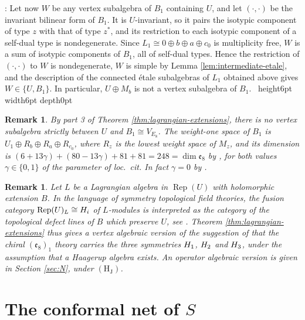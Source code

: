 \documentclass[leqno]{article}
\let\cal\relax
\newcommand{\cal}{\mathcal}
\newcommand{\qed}{\hfill \vrule height6pt  width6pt depth0pt}
\DeclareMathOperator{\Rep}{Rep} %
\newtheorem{remark}[thm]{Remark}
\newenvironment{proof}[1][]{\noindent {\it Proof #1} : }{\hbox{~}\qed
\smallskip
}
\numberwithin{equation}{section}
\begin{document}
\begin{proof}
Let now $W$ be any vertex subalgebra of $B_1$ containing $U$, and let $(\cdot,\cdot)$ be the invariant bilinear form of $B_1$. It is $U$-invariant, so it pairs the isotypic component of type $z$ with that of type $z^*$, and its restriction to each isotypic component of a self-dual type is nondegenerate. Since $L_1 \cong 0 \oplus b \oplus a \oplus c_0$ is multiplicity free, $W$ is a sum of isotypic components of $B_1$, all of self-dual types. Hence the restriction of $(\cdot,\cdot)$ to $W$ is nondegenerate, $W$ is simple by Lemma \ref{lem:intermediate-etale}, and the description of the connected \'etale subalgebras of $L_1$ obtained above gives $W \in \{U,B_1\}$. In particular, $U \oplus M_b$ is not a vertex subalgebra of $B_1$.
\end{proof}

\begin{remark}\normalfont
By part 3 of Theorem \ref{thm:lagrangian-extensions}, there is no vertex subalgebra strictly between $U$ and $B_1 \cong V_{E_8}$. The weight-one space of $B_1$ is $U_1 \oplus R_b \oplus R_a \oplus R_{c_0}$, where $R_z$ is the lowest weight space of $M_z$, and its dimension is $(6+13\gamma)+(80-13\gamma)+81+81 = 248 = \dim \mathfrak e_8$ by \cite[(4.1)]{Arh26}, for both values $\gamma \in \{0,1\}$ of the parameter of loc.\ cit. In fact $\gamma = 0$ by \cite[Theorem 7.1]{Arh26}.
\end{remark}

\begin{remark}\normalfont
\label{rem:symmetries}
Let $L$ be a Lagrangian algebra in $\Rep(U)$ with holomorphic extension $B$. In the language of symmetry topological field theories, the fusion category $\Rep(U)_L \cong \cal H_i$ of $L$-modules is interpreted as the category of the topological defect lines of $B$ which preserve $U$, see \cite{AHKZ26,GaR26,Hua26}. Theorem \ref{thm:lagrangian-extensions} thus gives a vertex algebraic version of the suggestion of \cite{AHKZ26} that the chiral $(\mathfrak e_8)_1$ theory carries the three symmetries $\cal H_1$, $\cal H_2$ and $\cal H_3$, under the assumption that a Haagerup algebra exists. An operator algebraic version is given in Section \ref{sec:N}, under $\mathrm{(H_J)}$.
\end{remark}

\section{The conformal net of \texorpdfstring{$S$}{S}}
\label{sec:net}
\end{document}
